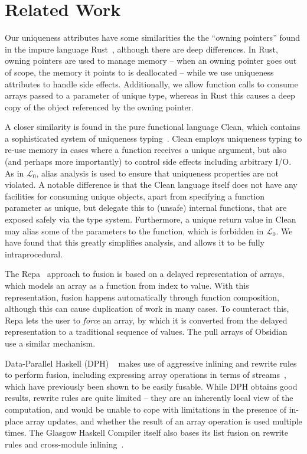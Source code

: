 \documentclass{sigplanconf}  %
\newcommand{\LO}{$\mathcal{L}_0$}
\begin{document}
\section{Related Work}
\label{sec:RelWork}

Our uniqueness attributes have some similarities the the ``owning
pointers'' found in the impure language Rust~\cite{rust}, although
there are deep differences.  In Rust, owning pointers are used to
manage memory -- when an owning pointer goes out of scope, the memory
it points to is deallocated -- while we use uniqueness attributes to
handle side effects.  Additionally, we allow function calls to consume
arrays passed to a parameter of unique type, whereas in Rust this
causes a deep copy of the object referenced by the owning pointer.

A closer similarity is found in the pure functional language Clean,
which contains a sophisticated system of uniqueness
typing~\cite{barendsen1996uniqueness}.  Clean employs uniqueness
typing to re-use memory in cases where a function receives a unique
argument, but also (and perhaps more importantly) to control side
effects including arbitrary I/O.  As in \LO{}, alias analysis is used
to ensure that uniqueness properties are not violated.  A notable
difference is that the Clean language itself does not have any
facilities for consuming unique objects, apart from specifying a
function parameter as unique, but delegate this to (unsafe) internal
functions, that are exposed safely via the type system.  Furthermore,
a unique return value in Clean may alias some of the parameters to the
function, which is forbidden in \LO{}.  We have found that this
greatly simplifies analysis, and allows it to be fully
intraprocedural.

The Repa~\cite{keller2010regular} approach to fusion is based on a
delayed representation of arrays, which models an array as a function
from index to value.  With this representation, fusion happens
automatically through function composition, although this can cause
duplication of work in many cases.  To counteract this, Repa lets the
user to {\em force} an array, by which it is converted from the
delayed representation to a traditional sequence of values.  The pull
arrays of Obsidian~\cite{claessen2012expressive} use a similar
mechanism.

Data-Parallel Haskell (DPH) ~\cite{chakravarty2007data} makes use of
aggressive inlining and rewrite rules to perform fusion, including
expressing array operations in terms of
streams~\cite{coutts2007rewriting}, which have previously been shown
to be easily fusable.  While DPH obtains good results, rewrite rules
are quite limited -- they are an inherently local view of the
computation, and would be unable to cope with limitations in the
presence of in-place array updates, and whether the result of an array
operation is used multiple times.  The Glasgow Haskell Compiler itself
also bases its list fusion on rewrite rules and cross-module
inlining~\cite{jones2001playing}.
\end{document}
